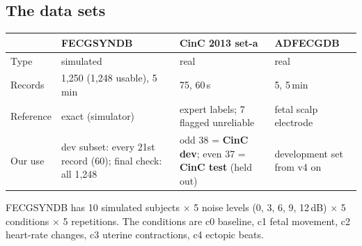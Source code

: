 \documentclass[11pt]{article}
\begin{document}
\subsection{The data sets}
\begin{center}
\small
\begin{tabularx}{\linewidth}{lXXX}
\toprule
 & \textbf{FECGSYNDB} & \textbf{CinC 2013 set-a} & \textbf{ADFECGDB} \\
\midrule
Type & simulated & real & real \\
Records & 1,250 (1,248 usable), 5\,min & 75, 60\,s & 5, 5\,min \\
Reference & exact (simulator) & expert labels; 7 flagged unreliable & fetal scalp electrode \\
Our use & dev subset: every 21st record (60); final check: all 1,248 & odd 38 = \textbf{CinC dev}; even 37 = \textbf{CinC test} (held out) & development set from v4 on \\
\bottomrule
\end{tabularx}
\end{center}
FECGSYNDB has 10 simulated subjects $\times$ 5 noise levels (0, 3, 6, 9, 12\,dB) $\times$ 5 conditions $\times$ 5 repetitions. The conditions are c0 baseline, c1 fetal movement, c2 heart-rate changes, c3 uterine contractions, c4 ectopic beats.
\end{document}
